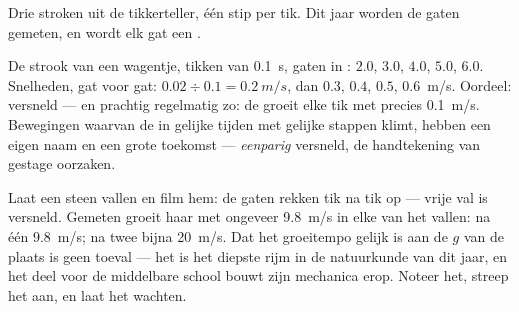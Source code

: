 \begin{omfigure}

{\small Drie stroken uit de tikkerteller, één stip per tik. Dit jaar
worden de gaten gemeten, en wordt elk gat een .}
\end{omfigure}

\begin{example}\label{ex:g9:uniform-varied-motion:worked}
De strook van een wagentje, tikken van \qty{0.1}{s}, gaten in
: $2.0$, $3.0$, $4.0$, $5.0$, $6.0$.
Snelheden, gat voor gat: $0.02 \div 0.1 = \qty{0.2}{m/s}$, dan
$0.3$, $0.4$, $0.5$, \qty{0.6}{m/s}. Oordeel: versneld --- en prachtig
regelmatig zo: de  groeit elke tik met precies
\qty{0.1}{m/s}. Bewegingen waarvan de  in gelijke
tijden met gelijke stappen klimt, hebben een eigen naam en een grote
toekomst --- \emph{eenparig} versneld, de handtekening van gestage
oorzaken.
\end{example}

\begin{example}\label{ex:g9:uniform-varied-motion:freefall}
Laat een steen vallen en film hem: de gaten rekken tik na tik op ---
vrije val is versneld. Gemeten groeit haar  met
ongeveer \qty{9.8}{m/s} in elke  van het vallen: na één 
\qty{9.8}{m/s}; na twee bijna \qty{20}{m/s}. Dat het groeitempo gelijk
is aan de $g$ van de plaats is geen toeval --- het is het diepste rijm
in de natuurkunde van dit jaar, en het deel voor de middelbare school
bouwt zijn mechanica erop. Noteer het, streep het aan, en laat het
wachten.
\end{example}

